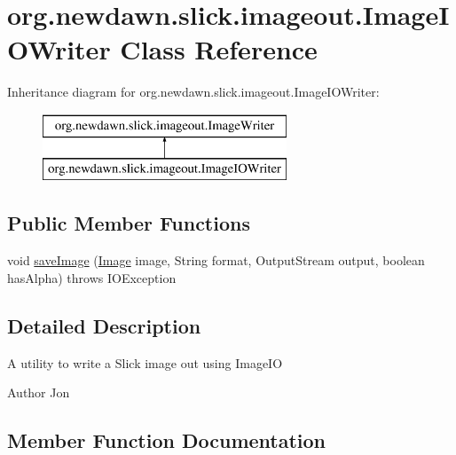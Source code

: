 \hypertarget{classorg_1_1newdawn_1_1slick_1_1imageout_1_1_image_i_o_writer}{}\section{org.\+newdawn.\+slick.\+imageout.\+Image\+I\+O\+Writer Class Reference}
\label{classorg_1_1newdawn_1_1slick_1_1imageout_1_1_image_i_o_writer}
Inheritance diagram for org.\+newdawn.\+slick.\+imageout.\+Image\+I\+O\+Writer\+:\begin{figure}[H]
\begin{center}
\leavevmode
\includegraphics[height=2.000000cm]{classorg_1_1newdawn_1_1slick_1_1imageout_1_1_image_i_o_writer}
\end{center}
\end{figure}
\subsection*{Public Member Functions}
\begin{DoxyCompactItemize}
\item 
void \mbox{\hyperlink{classorg_1_1newdawn_1_1slick_1_1imageout_1_1_image_i_o_writer_a16b8f7a58c4adc98658129bfaaafe751}{save\+Image}} (\mbox{\hyperlink{classorg_1_1newdawn_1_1slick_1_1_image}{Image}} image, String format, Output\+Stream output, boolean has\+Alpha)  throws I\+O\+Exception 
\end{DoxyCompactItemize}


\subsection{Detailed Description}
A utility to write a Slick image out using Image\+IO

\begin{DoxyAuthor}{Author}
Jon 
\end{DoxyAuthor}


\subsection{Member Function Documentation}
\mbox{\label{classorg_1_1newdawn_1_1slick_1_1imageout_1_1_image_i_o_writer_a16b8f7a58c4adc98658129bfaaafe751}} 
